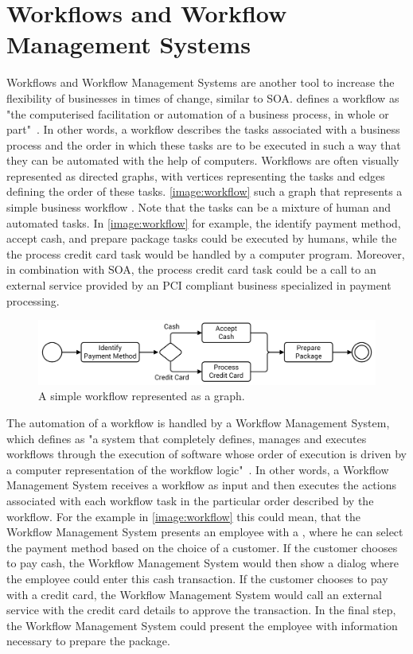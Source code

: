 \section{Workflows and Workflow Management Systems}

Workflows and Workflow Management Systems are another tool to increase the flexibility of businesses in times of change, similar to SOA.
\citeauthor*{workflow:referencemodel} defines a workflow as "the computerised facilitation or automation of a business process, in whole or part"~\autocite{workflow:referencemodel}.
In other words, a workflow describes the tasks associated with a business process and the order in which these tasks are to be executed in such a way that they can be automated with the help of computers.
Workflows are often visually represented as directed graphs, with vertices representing the tasks and edges defining the order of these tasks.
\autoref{image:workflow} such a graph that represents a simple business workflow .
Note that the tasks can be a mixture of human and automated tasks.
In \autoref{image:workflow} for example, the identify payment method, accept cash, and prepare package tasks could be executed by humans, while the the process credit card task would be handled by a computer program.
Moreover, in combination with SOA, the process credit card task could be a call to an external service provided by an PCI compliant business specialized in payment processing.

\begin{figure}[!htbp]
	\centering
	\includegraphics[resolution=600]{fundamentals/assets/workflow}
	\caption{A simple workflow represented as a graph.}
	\label{image:workflow}
\end{figure}

The automation of a workflow is handled by a Workflow Management System, which \citeauthor*{workflow:referencemodel} defines as "a system that completely defines, manages and executes workflows through the execution of software whose order of execution is driven by a computer representation of the workflow logic"~\autocite{workflow:referencemodel}.
In other words, a Workflow Management System receives a workflow as input and then executes the actions associated with each workflow task in the particular order described by the workflow.
For the example in \autoref{image:workflow} this could mean, that the Workflow Management System presents an employee with a , where he can select the payment method based on the choice of a customer.
If the customer chooses to pay cash, the Workflow Management System would then show a dialog where the employee could enter this cash transaction.
If the customer chooses to pay with a credit card, the Workflow Management System would call an external service with the credit card details to approve the transaction.
In the final step, the Workflow Management System could present the employee with information necessary to prepare the package.

